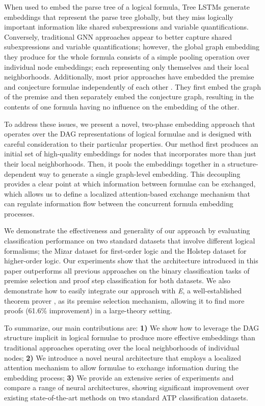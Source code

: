 \documentclass{article}
\begin{document}
When used to embed the parse tree of a logical formula, Tree LSTMs generate embeddings that represent the parse tree globally, but they miss logically important information like shared subexpressions and variable quantifications.
Conversely, traditional GNN approaches appear to better capture shared subexpressions and variable quantifications; however, the global graph embedding they produce for the whole formula consists of a simple pooling operation over individual node embeddings; each representing only themselves and their local neighborhoods. 
Additionally, most prior approaches have embedded the premise and conjecture formulae independently of each other \cite{wang2017premise,loos2017deep,paliwal2019graph,irving2016deepmath}. They first embed the graph of the premise and then separately embed the conjecture graph, resulting in the contents of one formula having no influence on the embedding of the other.


To address these issues, we present a novel, two-phase embedding approach that operates over the DAG representations of logical formulae and is designed with careful consideration to their particular properties. Our method first produces an initial set of high-quality embeddings for nodes that incorporates more than just their local neighborhoods. Then, it pools the embeddings together in a structure-dependent way to generate a single graph-level embedding. This decoupling provides a clear point at which information between formulae can be exchanged, which allows us to define a localized attention-based exchange mechanism that can regulate information flow between the concurrent formula embedding processes.

We demonstrate the effectiveness and generality of our approach by evaluating classification performance on two standard datasets that involve different logical formalisms; the Mizar dataset \cite{mizar40for40,irving2016deepmath} for first-order logic and the Holstep dataset \cite{kaliszyk2017holstep} for higher-order logic. Our experiments show that the architecture introduced in this paper outperforms all previous approaches on the binary classification tasks of premise selection and proof step classification for both datasets. We also demonstrate how to easily integrate our approach with \emph{E}, a well-established theorem prover \cite{schulz2013system}, as its premise selection mechanism, allowing it to find more proofs (61.6\% improvement) in a large-theory setting.

To summarize, our main contributions are:
{\bf 1)} We show how to leverage the DAG structure implicit in logical formulae to produce more effective embeddings than traditional approaches operating over the local neighborhoods of individual nodes; 
{\bf 2)} We introduce a novel neural architecture that employs a localized attention mechanism to allow formulae to exchange information during the embedding process;
{\bf 3)} We provide an extensive series of experiments and compare a range of neural architectures, showing significant improvement over existing state-of-the-art methods on two standard ATP classification datasets.
\end{document}
